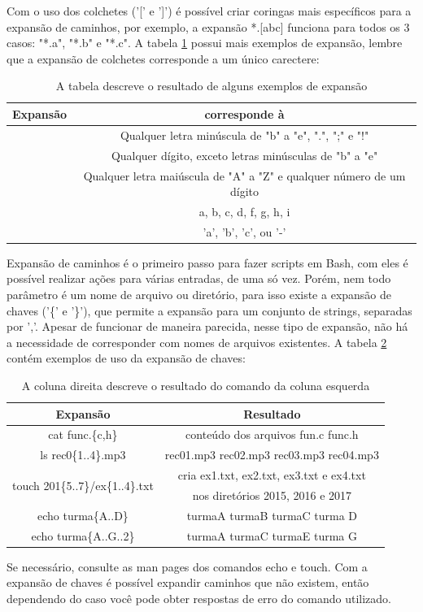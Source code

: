 \documentclass[oneside, 11 pt]{article}
\begin{document}
	Com o uso dos colchetes ('[' e ']') é possível criar coringas mais específicos para a expansão de caminhos, por exemplo, a expansão *.[abc] funciona para todos os 3 casos: "*.a", "*.b" e "*.c". A tabela \ref{table:2} possui mais exemplos de expansão, lembre que a expansão de colchetes corresponde a um único carectere:
	\begin{table}[!ht]
		\centering
		\begin{tabular}{ | c | c | } 
			\hline
			\bfseries Expansão & \bfseries corresponde à \\
			\hline
			[b-e.;!] & Qualquer letra minúscula de "b" a "e", ".", ";" e "!" \\
			\hline
			[!b-e] & Qualquer dígito, exceto letras minúsculas de "b" a "e" \\
			\hline
			[A-Z0-9] & Qualquer letra maiúscula de "A" a "Z" e qualquer número de um dígito \\
			\hline
			[a-df-i] & a, b, c, d, f, g, h, i \\
			\hline
			[abc-] & 'a', 'b', 'c', ou '-' \\
			\hline
		\end{tabular}
		\caption{A tabela descreve o resultado de alguns exemplos de expansão}
		\label{table:2}
	\end{table}
	
	Expansão de caminhos é o primeiro passo para fazer scripts em Bash, com eles é possível realizar ações para várias entradas, de uma só vez. Porém, nem todo parâmetro é um nome de arquivo ou diretório, para isso existe a expansão de chaves ('\{' e '\}'), que permite a expansão para um conjunto de strings, separadas por ','. Apesar de funcionar de maneira parecida, nesse tipo de expansão, não há a necessidade de corresponder com nomes de arquivos existentes. A tabela \ref{table:3} contém exemplos de uso da expansão de chaves:
	
	\begin{table}[!ht]
		\centering
		\begin{tabular}{ | c | c | } 
			\hline
			\bfseries Expansão & \bfseries Resultado \\
			\hline
			cat func.\{c,h\} & conteúdo dos arquivos fun.c func.h \\
			\hline
			ls rec0\{1..4\}.mp3 & rec01.mp3 rec02.mp3 rec03.mp3 rec04.mp3 \\
			\hline
			\multirow{2}{13em}{touch 201\{5..7\}/ex\{1..4\}.txt} & cria ex1.txt, ex2.txt, ex3.txt e ex4.txt \\ 
			& nos diretórios 2015, 2016 e 2017 \\
			\hline
			echo turma\{A..D\} & turmaA turmaB turmaC turma D\\
			\hline
			echo turma\{A..G..2\} & turmaA turmaC turmaE turma G\\
			\hline
		\end{tabular}
		\caption{A coluna direita descreve o resultado do comando da coluna esquerda}
		\label{table:3}
	\end{table}
	Se necessário, consulte as man pages dos comandos echo e touch. Com a expansão de chaves é possível expandir caminhos que não existem, então dependendo do caso você pode obter respostas de erro do comando utilizado.
	
\end{document}
